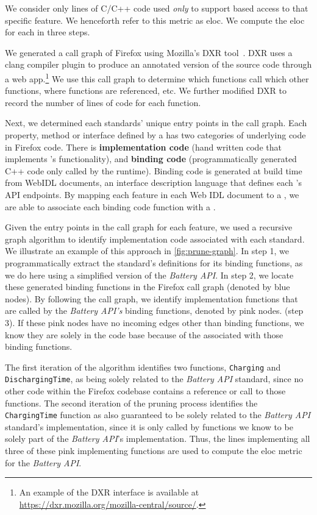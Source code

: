 We consider only lines of C/C++ code used \emph{only} to support \JS based access to that specific feature.
We henceforth refer to this metric as \gls{eloc}.
We compute the \gls{eloc} for each \WAS in three steps.

We generated a call graph of Firefox using Mozilla's DXR tool~\cite{dxr}.  DXR uses a clang compiler plugin to produce an
annotated version of the source code through a web app.\footnote{An example of the DXR interface is available at
\url{https://dxr.mozilla.org/mozilla-central/source/}.} We use this call graph
to determine which functions call which other functions, where functions are referenced, etc.
We further modified DXR to record the number of lines of code for each function.

Next, we determined each standards' unique entry points in the call graph.
Each property, method or interface defined by a \WAS has two categories of
underlying code in Firefox code.  There is
\textbf{implementation code} (hand written code that implements \WAS's
functionality), and \textbf{binding code} (programmatically generated C++ code
only called by the \JS runtime).  Binding code is generated at build time
from WebIDL documents, an interface description language that defines each \WAS's
\JS API endpoints. By mapping each feature in each Web IDL document to a \WAS,
we are able to associate each binding code function with a \WAS.



Given the entry points in the call graph for each \WA feature, we used a
recursive graph algorithm to identify implementation code
associated with each standard. We
illustrate an example of this approach in
\ref{fig:prune-graph}.  In step 1, we programmatically extract the
standard's definitions for its binding functions, as we do here using a
simplified version of  the \textit{Battery API}. In step 2, we locate these
generated binding functions in the Firefox call graph (denoted by blue nodes).
By following the call graph, we identify implementation functions that are
called by the \textit{Battery API's} binding functions, denoted by pink nodes.
(step 3). If these pink nodes have no incoming edges other than binding functions, we
know they are solely in the code base because of the \WAS associated with
those binding functions.

The first iteration of the algorithm identifies two functions,
\texttt{Charging} and \texttt{DischargingTime}, as being
solely related to the \textit{Battery API} standard, since no
other code within the Firefox codebase contains a reference or call to those
functions.  The second iteration of the pruning process identifies the
\texttt{ChargingTime} function as also guaranteed to be solely related to the
\textit{Battery API} standard's implementation, since it is only called by
functions we know to be solely part of the \textit{Battery API}'s
implementation. Thus, the lines implementing all three of these pink
implementing functions are used to compute the \gls{eloc} metric for the
\textit{Battery API}.


